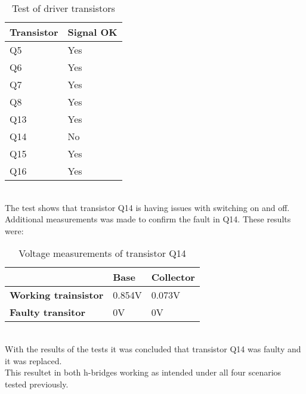 \begin{table}[h]
\centering
\begin{tabular}{|l|l|}
\hline
\textbf{Transistor} & \textbf{Signal OK} \\ \hline
\rowcolor[HTML]{EFEFEF} 
Q5                  & Yes                \\ \hline
Q6                  & Yes                \\ \hline
\rowcolor[HTML]{EFEFEF} 
Q7                  & Yes                \\ \hline
Q8                  & Yes                \\ \hline
\rowcolor[HTML]{EFEFEF} 
Q13                 & Yes                \\ \hline
Q14                 & No                 \\ \hline
\rowcolor[HTML]{EFEFEF} 
Q15                 & Yes                \\ \hline
Q16                 & Yes                \\ \hline
\end{tabular}
\caption{Test of driver transistors}
\label{drivertransistortest}
\end{table}\\
The test shows that transistor Q14 is having issues with switching on and off.\\
Additional measurements was made to confirm the fault in Q14. These results were:
\begin{table}[h]
\centering
\begin{tabular}{l|l|l}
\textbf{}                    & \textbf{Base} & \textbf{Collector} \\ \hline
\textbf{Working trainsistor} & 0.854V        & 0.073V             \\ \hline
\textbf{Faulty transitor}    & 0V            & 0V                
\end{tabular}
\caption{Voltage measurements of transistor Q14}
\label{q14measurements}
\end{table}\\
With the results of the tests it was concluded that transistor Q14 was faulty and it was replaced.\\
This resultet in both h-bridges working as intended under all four scenarios tested previously.